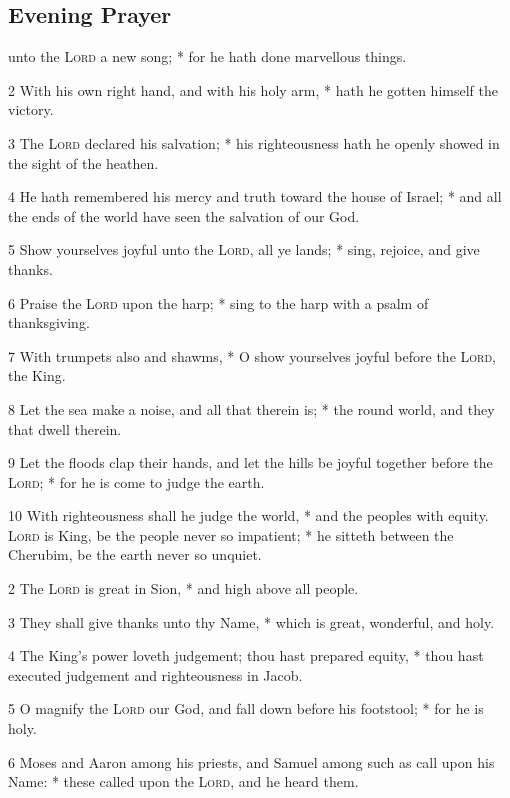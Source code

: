 \subsection{Evening Prayer}
 unto the {\textsc{Lord}} a new song; * for he hath done marvellous things.\par
2 With his own right hand, and with his holy arm, * hath he gotten himself the victory.\par
3 The {\textsc{Lord}} declared his salvation; * his righteousness hath he openly showed in the sight of the heathen.\par
4 He hath remembered his mercy and truth toward the house of Israel; * and all the ends of the world have seen the salvation of our God.\par
5 Show yourselves joyful unto the {\textsc{Lord}}, all ye lands; * sing, rejoice, and give thanks.\par
6 Praise the {\textsc{Lord}} upon the harp; * sing to the harp with a psalm of thanksgiving.\par
7 With trumpets also and shawms, * O show yourselves joyful before the {\textsc{Lord}}, the King.\par
8 Let the sea make a noise, and all that therein is; * the round world, and they that dwell therein.\par
9 Let the floods clap their hands, and let the hills be joyful together before the {\textsc{Lord}}; * for he is come to judge the earth.\par
10 With righteousness shall he judge the world, * and the peoples with equity.
 {\textsc{Lord}} is King, be the people never so impatient; * he sitteth between the Cherubim, be the earth never so unquiet.\par
2 The {\textsc{Lord}} is great in Sion, * and high above all people.\par
3 They shall give thanks unto thy Name, * which is great, wonderful, and holy.\par
4 The King's power loveth judgement; thou hast prepared equity, * thou hast executed judgement and righteousness in Jacob.\par
5 O magnify the {\textsc{Lord}} our God, and fall down before his footstool; * for he is holy.\par
6 Moses and Aaron among his priests, and Samuel among such as call upon his Name: * these called upon the {\textsc{Lord}}, and he heard them.\par
